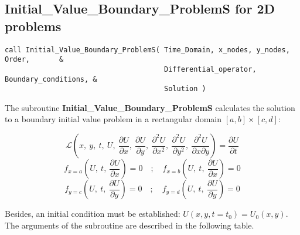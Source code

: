 \subsection*{Initial\_Value\_Boundary\_ProblemS for 2D problems}

\lstset{language=Fortran}
\begin{lstlisting}[frame=trBL]
call Initial_Value_Boundary_ProblemS( Time_Domain, x_nodes, y_nodes, Order,       & 
                                      Differential_operator, Boundary_conditions, & 
                                      Solution ) 
\end{lstlisting}   

The subroutine \textbf{Initial\_Value\_Boundary\_ProblemS} calculates the solution to a boundary initial value problem in a rectangular domain $[a,b] \times [c,d]$:

\begin{equation*}
\mathscr{L}\left(x,\ y,\ t,\  U, \ \frac{\partial U}{\partial x}, \ \frac{\partial U}{\partial y}, \ \frac{\partial^2 U}{\partial x^2}, \ \frac{\partial^2 U}{\partial y^2}, \ \frac{\partial^2 U}{\partial x \partial y} \right) = \frac{\partial U}{\partial t}
\end{equation*}
\begin{equation*}
f_{x=a}\left(U, \  t, \  \frac{\partial U}{\partial x}\right)=0  \quad ; \quad f_{x=b}\left(U, \ t, \ \frac{\partial U}{\partial x}\right)=0  
\end{equation*}
\begin{equation*}
f_{y=c}\left(U, \ t, \ \frac{\partial U}{\partial y}\right)=0  \quad ; \quad f_{y=d}\left(U, \ t, \ \frac{\partial U}{\partial y}\right)=0  
\end{equation*}


Besides, an initial condition must be established: $U(x, y ,t = t_0) = U_0 (x,y)$.
The arguments of the subroutine are described in the following table.

